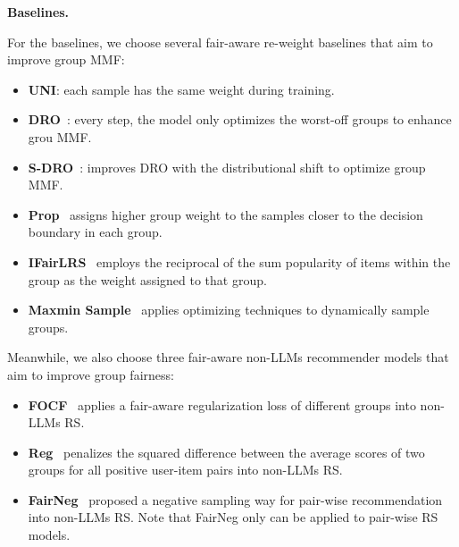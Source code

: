 \textbf{Baselines.}

For the baselines, we choose several fair-aware re-weight baselines that aim to improve group MMF: 
\begin{itemize}
    \item \textbf{UNI}: each sample has the same weight during training.
    \item \textbf{DRO}~\citep{hashimoto2018fairness}: every step, the model only optimizes the worst-off groups to enhance grou MMF.
    \item \textbf{S-DRO}~\citep{wen2022distributionally}: improves DRO with the distributional shift to optimize group MMF.
    \item \textbf{Prop}~\citep{hu2023adaptive}  assigns higher group weight to the samples closer to the decision boundary in each group.
    \item \textbf{IFairLRS}~\citep{jiang2024itemside} employs the reciprocal of the sum popularity of items within the group as the weight assigned to that group. 
    \item \textbf{Maxmin Sample}~\citep{abernethy2022active} applies optimizing techniques to dynamically sample groups.
\end{itemize}



Meanwhile, we also choose three fair-aware non-LLMs recommender models that aim to improve group fairness:
\begin{itemize}
    \item \textbf{FOCF}~\citep{FOCF} applies a fair-aware regularization loss of different groups into non-LLMs RS.
    \item \textbf{Reg}~\citep{Reg} penalizes the squared difference between the average scores of two groups for all positive user-item pairs into non-LLMs RS.
    \item \textbf{FairNeg}~\citep{FairNeg} proposed a negative sampling way for pair-wise recommendation into non-LLMs RS. Note that FairNeg only can be applied to pair-wise RS models. 
\end{itemize}


